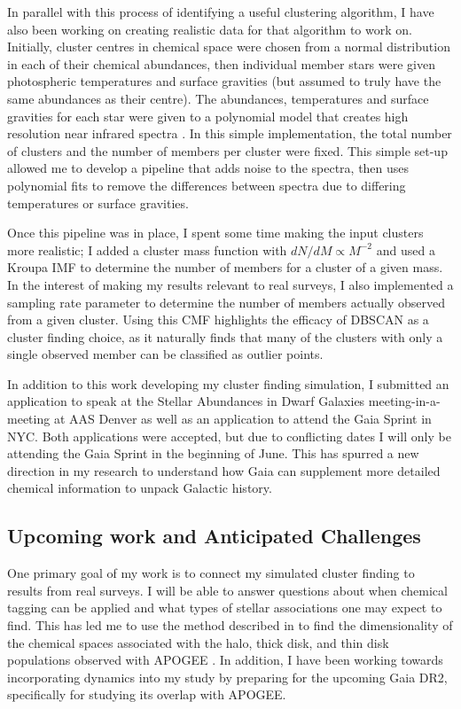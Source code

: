 \documentclass[11pt]{article}
\begin{document}
    In parallel with this process of identifying a useful clustering algorithm, I have also been working on creating realistic data for that algorithm to work on. Initially, cluster centres in chemical space were chosen from a normal distribution in each of their chemical abundances, then individual member stars were given photospheric temperatures and surface gravities (but assumed to truly have the same abundances as their centre). The abundances, temperatures and surface gravities for each star were given to a polynomial model that creates high resolution near infrared spectra \citep{Rix2016}. In this simple implementation, the total number of clusters and the number of members per cluster were fixed. This simple set-up allowed me to develop a pipeline that adds noise to the spectra, then uses polynomial fits to remove the differences between spectra due to differing temperatures or surface gravities.
    
    Once this pipeline was in place, I spent some time making the input clusters more realistic; I added a cluster mass function with $dN/dM\propto M^{-2}$ and used a Kroupa IMF to determine the number of members for a cluster of a given mass. In the interest of making my results relevant to real surveys, I also implemented a sampling rate parameter to determine the number of members actually observed from a given cluster. Using this CMF highlights the efficacy of DBSCAN as a cluster finding choice, as it naturally finds that many of the clusters with only a single observed member can be classified as outlier points.
    
    In addition to this work developing my cluster finding simulation, I submitted an application to speak at the Stellar Abundances in Dwarf Galaxies meeting-in-a-meeting at AAS Denver as well as an application to attend the Gaia Sprint in NYC. Both applications were accepted, but due to conflicting dates I will only be attending the Gaia Sprint in the beginning of June. This has spurred a new direction in my research to understand how Gaia can supplement more detailed chemical information to unpack Galactic history.
  
    
    \subsection*{Upcoming work and Anticipated Challenges} 
    
    One primary goal of my work is to connect my simulated cluster finding to results from real surveys. I will be able to answer questions about when chemical tagging can be applied and what types of stellar associations one may expect to find. This has led me to use the method described in \citet{Price-Jones2018} to find the dimensionality of the chemical spaces associated with the halo, thick disk, and thin disk populations observed with APOGEE \citep{Majewski2017}. In addition, I have been working towards incorporating dynamics into my study by preparing for the upcoming Gaia DR2, specifically for studying its overlap with APOGEE.
    
\end{document}
